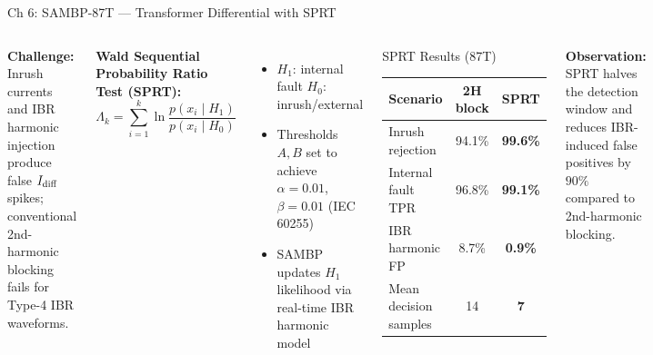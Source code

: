 \documentclass[10pt,aspectratio=169]{beamer}
\newcommand{\obs}[1]{%
  {\color{iitmred}\textbf{Observation:} #1}%
}
\begin{document}
\begin{frame}{Ch 6: SAMBP-87T — Transformer Differential with SPRT}
  \begin{columns}[T]
      \textbf{Challenge:} Inrush currents and IBR harmonic injection
      produce false $I_{\rm diff}$ spikes; conventional 2nd-harmonic
      blocking fails for Type-4 IBR waveforms.

      \medskip
      \textbf{Wald Sequential Probability Ratio Test (SPRT):}
      \[
        \Lambda_k = \sum_{i=1}^k \ln
          \frac{p(x_i \mid H_1)}{p(x_i \mid H_0)}
      \]
      \begin{itemize}\itemsep3pt
        \item $H_1$: internal fault \quad $H_0$: inrush/external
        \item Thresholds $A, B$ set to achieve
          $\alpha{=}0.01$, $\beta{=}0.01$ (IEC 60255)
        \item SAMBP updates $H_1$ likelihood via real-time
          IBR harmonic model
      \end{itemize}
      \begin{block}{\small SPRT Results (87T)}
        \small
        \begin{tabular}{lcc}
          \toprule
          Scenario & 2H block & SPRT \\
          \midrule
          Inrush rejection & 94.1\% & \textbf{99.6\%} \\
          Internal fault TPR & 96.8\% & \textbf{99.1\%}\\
          IBR harmonic FP & 8.7\% & \textbf{0.9\%}\\
          Mean decision samples & 14 & \textbf{7}\\
          \bottomrule
        \end{tabular}
      \end{block}
      \vspace{0.3cm}
      \obs{SPRT halves the detection window and
        reduces IBR-induced false positives by
        $90\%$ compared to 2nd-harmonic blocking.}
  \end{columns}
\end{frame}
\end{document}
